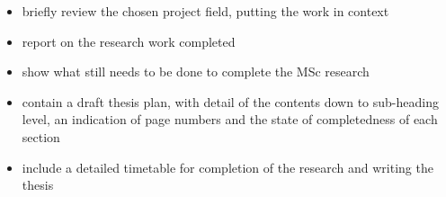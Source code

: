 \documentclass[a4paper,10pt]{article}
\begin{document}
\begin{itemize} 
\item briefly review the chosen project field, putting the work in context 
\item report on the research work completed 
\item show what still needs to be done to complete the MSc 
research 
\item contain a draft thesis plan, with detail of the 
contents down to sub-heading level, an indication of page numbers 
and the state of completedness of each section 
\item include a detailed timetable for completion of the research and writing the 
thesis \end{itemize}
\end{document}
